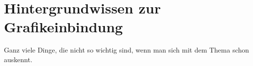 %

\chapter{Hintergrundwissen zur Grafikeinbindung}

Ganz viele Dinge, die nicht so wichtig sind, wenn man sich mit dem Thema schon
auskennt.